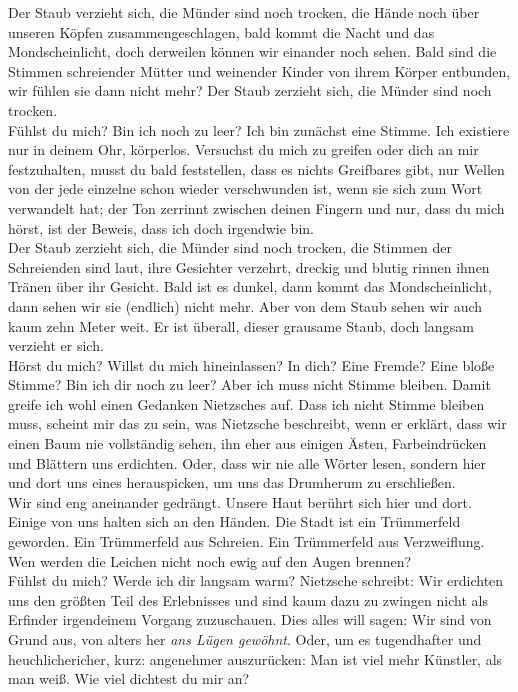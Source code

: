 \documentclass[a4paper, 12pt]{article}
\begin{document}
Der Staub verzieht sich, die Münder sind noch trocken, die Hände noch über unseren Köpfen zusammengeschlagen, bald kommt die Nacht und das Mondscheinlicht, doch derweilen können wir einander noch sehen. 
Bald sind die Stimmen schreiender Mütter und weinender Kinder von ihrem Körper entbunden, wir fühlen sie dann nicht mehr?
Der Staub zerzieht sich, die Münder sind noch trocken. \\

Fühlst du mich? 
Bin ich noch zu leer? 
Ich bin zunächst eine Stimme. 
Ich existiere nur in deinem Ohr, körperlos.
Versuchst du mich zu greifen oder dich an mir festzuhalten, musst du bald feststellen, dass es nichts Greifbares gibt, nur Wellen von der jede einzelne schon wieder verschwunden ist, wenn sie sich zum Wort verwandelt hat;
der Ton zerrinnt zwischen deinen Fingern und nur, dass du mich hörst, ist der Beweis, dass ich doch irgendwie bin.\\

Der Staub zerzieht sich, die Münder sind noch trocken, die Stimmen der Schreienden sind laut, ihre Gesichter verzehrt, dreckig und blutig rinnen ihnen Tränen über ihr Gesicht.
Bald ist es dunkel, dann kommt das Mondscheinlicht, dann sehen wir sie (endlich) nicht mehr.
Aber von dem Staub sehen wir auch kaum zehn Meter weit. 
Er ist überall, dieser grausame Staub, doch langsam verzieht er sich. \\

Hörst du mich? Willst du mich hineinlassen? In dich? Eine Fremde? Eine bloße Stimme?
Bin ich dir noch zu leer?
Aber ich muss nicht Stimme bleiben. 
Damit greife ich wohl einen Gedanken Nietzsches auf. 
Dass ich nicht Stimme bleiben muss, scheint mir das zu sein, was Nietzsche beschreibt, wenn er erklärt, dass wir einen Baum nie vollständig sehen, ihn eher aus einigen Ästen, Farbeindrücken und Blättern uns erdichten.
Oder, dass wir nie alle Wörter lesen, sondern hier und dort uns eines herauspicken, um uns das Drumherum zu erschließen.\\

Wir sind eng aneinander gedrängt.
Unsere Haut berührt sich hier und dort.
Einige von uns halten sich an den Händen.
Die Stadt ist ein Trümmerfeld geworden. 
Ein Trümmerfeld aus Schreien.
Ein Trümmerfeld aus Verzweiflung.
Wen werden die Leichen nicht noch ewig auf den Augen brennen?\\

Fühlst du mich? Werde ich dir langsam warm? Nietzsche schreibt: 
\glqq Wir erdichten uns den größten Teil des Erlebnisses und sind kaum dazu zu zwingen nicht als \glq Erfinder\grq{} irgendeinem Vorgang zuzuschauen. 
Dies alles will sagen: Wir sind von Grund aus, von alters her \textit{ans Lügen gewöhnt}. Oder, um es tugendhafter und heuchlichericher, kurz: angenehmer auszurücken: 
Man ist viel mehr Künstler, als man weiß\grqq. 
Wie viel dichtest du mir an?\\
\end{document}
